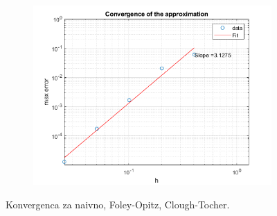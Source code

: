 \documentclass{article}
\begin{document}
\begin{figure}[H]
\begin{subfigure}{.3\textwidth}
\includegraphics[width=\linewidth]{slike/conv3.png}
\end{subfigure}
\caption*{Konvergenca za naivno, Foley-Opitz, Clough-Tocher.}
\end{figure}
\end{document}
